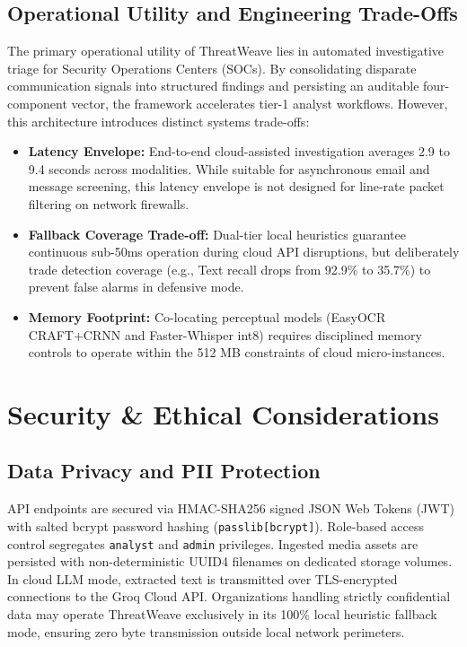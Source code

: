 \documentclass[conference]{IEEEtran}
\begin{document}
\subsection{Operational Utility and Engineering Trade-Offs}
The primary operational utility of ThreatWeave lies in automated investigative triage for Security Operations Centers (SOCs). By consolidating disparate communication signals into structured findings and persisting an auditable four-component vector, the framework accelerates tier-1 analyst workflows. However, this architecture introduces distinct systems trade-offs:
\begin{itemize}
    \item \textbf{Latency Envelope:} End-to-end cloud-assisted investigation averages 2.9 to 9.4 seconds across modalities. While suitable for asynchronous email and message screening, this latency envelope is not designed for line-rate packet filtering on network firewalls.
    \item \textbf{Fallback Coverage Trade-off:} Dual-tier local heuristics guarantee continuous sub-50ms operation during cloud API disruptions, but deliberately trade detection coverage (e.g., Text recall drops from 92.9\% to 35.7\%) to prevent false alarms in defensive mode.
    \item \textbf{Memory Footprint:} Co-locating perceptual models (EasyOCR CRAFT+CRNN and Faster-Whisper int8) requires disciplined memory controls to operate within the 512 MB constraints of cloud micro-instances.
\end{itemize}

\section{Security \& Ethical Considerations}
\subsection{Data Privacy and PII Protection}
API endpoints are secured via HMAC-SHA256 signed JSON Web Tokens (JWT) with salted bcrypt password hashing (\texttt{passlib[bcrypt]}). Role-based access control segregates \texttt{analyst} and \texttt{admin} privileges. Ingested media assets are persisted with non-deterministic UUID4 filenames on dedicated storage volumes. In cloud LLM mode, extracted text is transmitted over TLS-encrypted connections to the Groq Cloud API. Organizations handling strictly confidential data may operate ThreatWeave exclusively in its 100\% local heuristic fallback mode, ensuring zero byte transmission outside local network perimeters.
\end{document}
